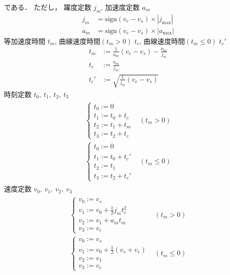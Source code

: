 \documentclass[a5paper]{ltjsarticle}
\begin{document}
である．
ただし，
躍度定数 $j_m$,
加速度定数 $a_m$
\begin{align}
    j_m & = \mathrm{sign}(v_e-v_s) \times|j_{\max}| \\
    a_m & = \mathrm{sign}(v_e-v_s) \times|a_{\max}|
\end{align}
等加速度時間 $t_m$,
曲線速度時間$(t_m>0)$ $t_c$,
曲線速度時間$(t_m\leq 0)$ $t_c'$
\begin{align}
    t_m  & := \frac{1}{a_m}(v_e - v_s) - \frac{a_m}{j_m} \\
    t_c  & := \frac{a_m}{j_m}                            \\
    t_c' & := \sqrt{\frac{1}{j_m}(v_e-v_s)}
\end{align}
時刻定数 $t_0,~t_1,~t_2,~t_3$
\begin{align}
    \begin{array}{ll}
        \left\{ \begin{array}{l}
            t_0 := 0         \\
            t_1 := t_0 + t_c \\
            t_2 := t_1 + t_m \\
            t_3 := t_2 + t_c
        \end{array} \right.
         &
        (t_m > 0)
        \\
        \left\{ \begin{array}{l}
            t_0 := 0          \\
            t_1 := t_0 + t_c' \\
            t_2 := t_1        \\
            t_3 := t_2 + t_c'
        \end{array} \right.
         &
        (t_m \leq 0)
    \end{array}
\end{align}
速度定数 $v_0,~v_1,~v_2,~v_3$
\begin{align}
    \begin{array}{ll}
        \left\{ \begin{array}{l}
            v_0 := v_s                        \\
            v_1 := v_0 + \frac{1}{2}j_m t_c^2 \\
            v_2 := v_1 + a_m t_m              \\
            v_3 := v_e
        \end{array} \right.
         &
        (t_m > 0)
        \\
        \left\{ \begin{array}{l}
            v_0 := v_s                                     \\
            v_1 := v_0 + \frac{1}{2}\left( v_s+v_e \right) \\
            v_2 := v_1                                     \\
            v_3 := v_e
        \end{array} \right.
         &
        (t_m \leq 0)
    \end{array}
\end{align}
\end{document}

